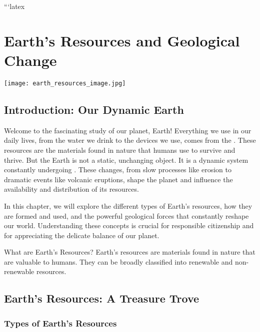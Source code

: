 ```latex
\chapter{Earth's Resources and Geological Change}

\begin{marginfigure}
\texttt{[image: earth\_resources\_image.jpg]}
\caption*{\textit{Image of diverse Earth resources: minerals, forests, water, and fossil fuels.}}
\end{marginfigure}

\section{Introduction: Our Dynamic Earth}

Welcome to the fascinating study of our planet, Earth!  Everything we use in our daily lives, from the water we drink to the devices we use, comes from the .  These resources are the materials found in nature that humans use to survive and thrive.  But the Earth is not a static, unchanging object. It is a dynamic system constantly undergoing .  These changes, from slow processes like erosion to dramatic events like volcanic eruptions, shape the planet and influence the availability and distribution of its resources.

In this chapter, we will explore the different types of Earth's resources, how they are formed and used, and the powerful geological forces that constantly reshape our world.  Understanding these concepts is crucial for responsible citizenship and for appreciating the delicate balance of our planet.

\begin{keyconcept}{What are Earth's Resources?}
Earth's resources are materials found in nature that are valuable to humans. They can be broadly classified into renewable and non-renewable resources.
\end{keyconcept}

\section{Earth's Resources: A Treasure Trove}

\subsection{Types of Earth's Resources}

